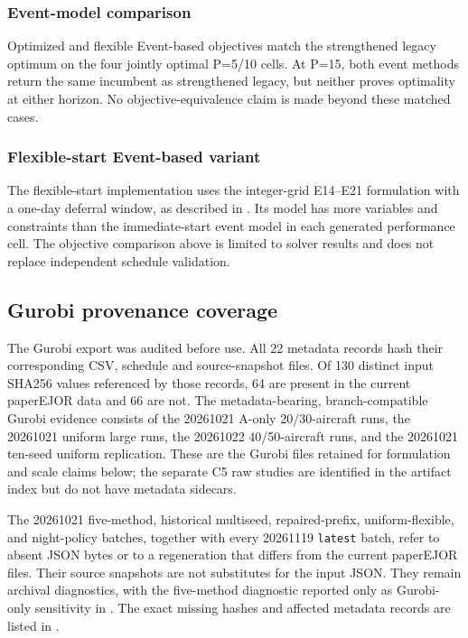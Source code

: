 \subsubsection{Event-model comparison}

Optimized and flexible Event-based objectives match the strengthened legacy
optimum on the four jointly optimal P=5/10 cells. At P=15, both event methods
return the same incumbent as strengthened legacy, but neither proves
optimality at either horizon. No objective-equivalence claim is made beyond
these matched cases.

\subsubsection{Flexible-start Event-based variant}

The flexible-start implementation uses the integer-grid E14--E21 formulation
with a one-day deferral window, as described in
. Its model has more variables and constraints
than the immediate-start event model in each generated performance cell. The
objective comparison above is limited to solver results and does not replace
independent schedule validation.





\subsection{Gurobi provenance coverage}
\label{subsec:gurobi_provenance}

The Gurobi export was audited before use. All 22 metadata records hash their
corresponding CSV, schedule and source-snapshot files. Of 130 distinct input
SHA256 values referenced by those records, 64 are present in the current
paperEJOR data and 66 are not. The metadata-bearing, branch-compatible Gurobi
evidence consists of the 20261021 A-only 20/30-aircraft runs, the 20261021
uniform large runs, the 20261022 40/50-aircraft runs, and the 20261021 ten-seed
uniform replication. These are the Gurobi files retained for formulation and
scale claims below; the separate C5 raw studies are identified in the artifact
index but do not have metadata sidecars.

The 20261021 five-method, historical multiseed, repaired-prefix, uniform-flexible,
and night-policy batches, together with every 20261119 \texttt{latest} batch,
refer to absent JSON bytes or to a regeneration that differs from the current
paperEJOR files. Their source snapshots are not substitutes for the input
JSON. They remain archival diagnostics, with the five-method diagnostic
reported only as Gurobi-only sensitivity in
. The exact missing hashes and affected
metadata records are listed in .

